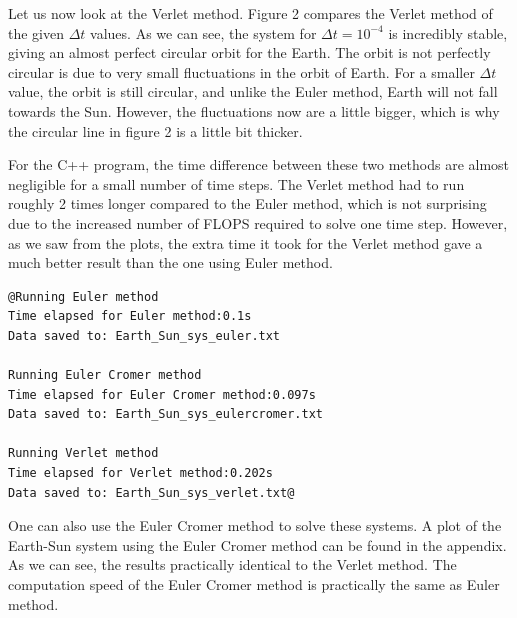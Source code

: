 \documentclass[12pt]{article}
\begin{document}
Let us now look at the Verlet method. Figure 2 compares the Verlet method of the given $\Delta t$ values. As we can see, the system for $\Delta t = 10^{-4}$ is incredibly stable, giving an almost perfect circular orbit for the Earth. The orbit is not perfectly circular is due to very small fluctuations in the orbit of Earth. For a smaller $\Delta t$ value, the orbit is still circular, and unlike the Euler method, Earth will not fall towards the Sun. However, the fluctuations now are a little bigger, which is why the circular line in figure 2 is a little bit thicker. 


For the C++ program, the time difference between these two methods are almost negligible for a small number of time steps. The Verlet method had to run roughly 2 times longer compared to the Euler method, which is not surprising due to the increased number of FLOPS required to solve one time step. However, as we saw from the plots, the extra time it took for the Verlet method gave a much better result than the one using Euler method.

\begin{lstlisting}
@Running Euler method
Time elapsed for Euler method:0.1s
Data saved to: Earth_Sun_sys_euler.txt

Running Euler Cromer method
Time elapsed for Euler Cromer method:0.097s
Data saved to: Earth_Sun_sys_eulercromer.txt

Running Verlet method
Time elapsed for Verlet method:0.202s
Data saved to: Earth_Sun_sys_verlet.txt@
\end{lstlisting}

One can also use the Euler Cromer method to solve these systems. A plot of the Earth-Sun system using the Euler Cromer method can be found in the appendix. As we can see, the results practically identical to the Verlet method. The computation speed of the Euler Cromer method is practically the same as Euler method.
\end{document}
